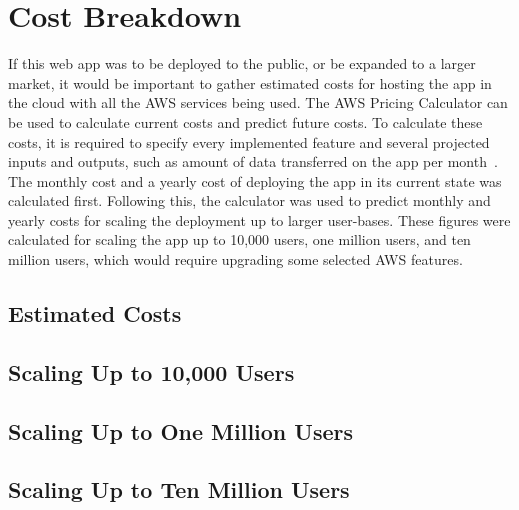 \chapter{Cost Breakdown}\label{ch:cost-breakdown}

If this web app was to be deployed to the public, or be expanded to a larger market, it would be important to
gather estimated costs for hosting the app in the cloud with all the AWS services being used.
The AWS Pricing Calculator can be used to calculate current costs and predict future costs.
To calculate these costs, it is required to specify every implemented feature and several projected inputs and outputs,
such as amount of data transferred on the app per month~\parencite{amazon2022aws}.
The monthly cost and a yearly cost of deploying the app in its current state was calculated first.
Following this, the calculator was used to predict monthly and yearly costs for scaling the deployment up to larger
user-bases.
These figures were calculated for scaling the app up to 10,000 users, one million users, and ten million users, which
would require upgrading some selected AWS features.

\section{Estimated Costs}\label{sec:estimated-costs}

\section{Scaling Up to 10,000 Users}\label{sec:scaling-up-to-10000-users}

\section{Scaling Up to One Million Users}\label{sec:scaling-up-to-1-million-users}

\section{Scaling Up to Ten Million Users}\label{sec:scaling-up-to-10-million-users}
